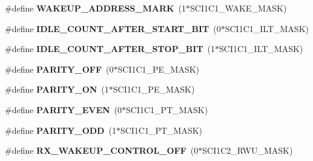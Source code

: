 \begin{DoxyCompactItemize}
\item 
\hypertarget{group__hal__hcs08_ga18f8279aba1ee4c344e1b1b467536a6b}{\#define {\bfseries W\-A\-K\-E\-U\-P\-\_\-\-A\-D\-D\-R\-E\-S\-S\-\_\-\-M\-A\-R\-K}~(1$\ast$S\-C\-I1\-C1\-\_\-\-W\-A\-K\-E\-\_\-\-M\-A\-S\-K)}\label{group__hal__hcs08_ga18f8279aba1ee4c344e1b1b467536a6b}

\item 
\hypertarget{group__hal__hcs08_ga28374a7264f20336ce6c2c54a5b04909}{\#define {\bfseries I\-D\-L\-E\-\_\-\-C\-O\-U\-N\-T\-\_\-\-A\-F\-T\-E\-R\-\_\-\-S\-T\-A\-R\-T\-\_\-\-B\-I\-T}~(0$\ast$S\-C\-I1\-C1\-\_\-\-I\-L\-T\-\_\-\-M\-A\-S\-K)}\label{group__hal__hcs08_ga28374a7264f20336ce6c2c54a5b04909}

\item 
\hypertarget{group__hal__hcs08_gab8165c5333007979a7ad0ce33e7a8acd}{\#define {\bfseries I\-D\-L\-E\-\_\-\-C\-O\-U\-N\-T\-\_\-\-A\-F\-T\-E\-R\-\_\-\-S\-T\-O\-P\-\_\-\-B\-I\-T}~(1$\ast$S\-C\-I1\-C1\-\_\-\-I\-L\-T\-\_\-\-M\-A\-S\-K)}\label{group__hal__hcs08_gab8165c5333007979a7ad0ce33e7a8acd}

\item 
\hypertarget{group__hal__hcs08_ga8142bbc0d82c0406de8f5f128cbb44b1}{\#define {\bfseries P\-A\-R\-I\-T\-Y\-\_\-\-O\-F\-F}~(0$\ast$S\-C\-I1\-C1\-\_\-\-P\-E\-\_\-\-M\-A\-S\-K)}\label{group__hal__hcs08_ga8142bbc0d82c0406de8f5f128cbb44b1}

\item 
\hypertarget{group__hal__hcs08_gab3f60f495dad3c9f992ff8e0a59f2b49}{\#define {\bfseries P\-A\-R\-I\-T\-Y\-\_\-\-O\-N}~(1$\ast$S\-C\-I1\-C1\-\_\-\-P\-E\-\_\-\-M\-A\-S\-K)}\label{group__hal__hcs08_gab3f60f495dad3c9f992ff8e0a59f2b49}

\item 
\hypertarget{group__hal__hcs08_ga64de75e13d62a653f2a2b5c41e0374c2}{\#define {\bfseries P\-A\-R\-I\-T\-Y\-\_\-\-E\-V\-E\-N}~(0$\ast$S\-C\-I1\-C1\-\_\-\-P\-T\-\_\-\-M\-A\-S\-K)}\label{group__hal__hcs08_ga64de75e13d62a653f2a2b5c41e0374c2}

\item 
\hypertarget{group__hal__hcs08_ga25e17ce6ba7124885e170c47bcd833e5}{\#define {\bfseries P\-A\-R\-I\-T\-Y\-\_\-\-O\-D\-D}~(1$\ast$S\-C\-I1\-C1\-\_\-\-P\-T\-\_\-\-M\-A\-S\-K)}\label{group__hal__hcs08_ga25e17ce6ba7124885e170c47bcd833e5}

\item 
\hypertarget{group__hal__hcs08_gabacdf9b833047b2b834cf92e6137bcce}{\#define {\bfseries R\-X\-\_\-\-W\-A\-K\-E\-U\-P\-\_\-\-C\-O\-N\-T\-R\-O\-L\-\_\-\-O\-F\-F}~(0$\ast$S\-C\-I1\-C2\-\_\-\-R\-W\-U\-\_\-\-M\-A\-S\-K)}\label{group__hal__hcs08_gabacdf9b833047b2b834cf92e6137bcce}


\end{DoxyCompactItemize}
